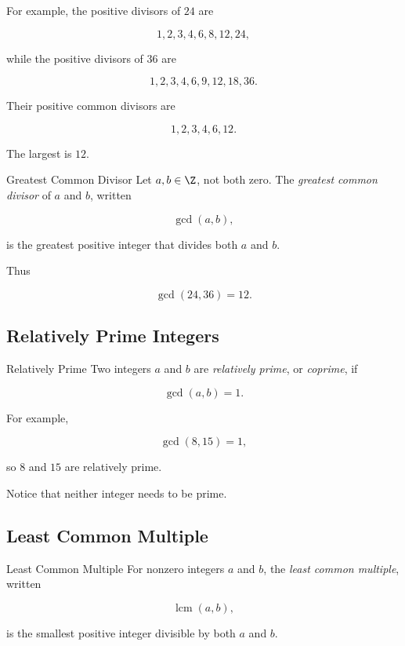 For example, the positive divisors of \(24\) are

\[ 1,2,3,4,6,8,12,24, \]

while the positive divisors of \(36\) are

\[ 1,2,3,4,6,9,12,18,36. \]

Their positive common divisors are

\[ 1,2,3,4,6,12. \]

The largest is \(12\).

\begin{definitionbox}{Greatest Common Divisor}
Let \(a,b\in\Z\), not both zero. The \emph{greatest common divisor} of \(a\)
and \(b\), written

\[ \gcd(a,b), \]

is the greatest positive integer that divides both \(a\) and \(b\).
\end{definitionbox}

Thus

\[ \gcd(24,36)=12. \]

\subsection{Relatively Prime Integers}
\label{subsec:relatively-prime}

\begin{definitionbox}{Relatively Prime}
Two integers \(a\) and \(b\) are \emph{relatively prime}, or \emph{coprime},
if

\[ \gcd(a,b)=1. \]
\end{definitionbox}

For example,

\[ \gcd(8,15)=1, \]

so \(8\) and \(15\) are relatively prime.

Notice that neither integer needs to be prime.

\subsection{Least Common Multiple}
\label{subsec:least-common-multiple}

\begin{definitionbox}{Least Common Multiple}
For nonzero integers \(a\) and \(b\), the \emph{least common multiple},
written

\[ \operatorname{lcm}(a,b), \]

is the smallest positive integer divisible by both \(a\) and \(b\).
\end{definitionbox}

